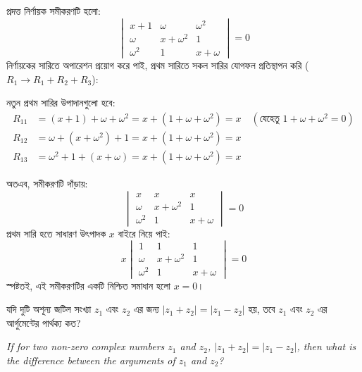 \documentclass[12pt, a4paper]{article}
\begin{document}
\begin{tcolorbox}[solutionbox={সমাধান (Solution)}]
    \noindent
    প্রদত্ত নির্ণায়ক সমীকরণটি হলো:
    \[ \begin{vmatrix} x+1 & \omega & \omega^2 \\ \omega & x+\omega^2 & 1 \\ \omega^2 & 1 & x+\omega \end{vmatrix} = 0 \]
    নির্ণায়কের সারিতে অপারেশন প্রয়োগ করে পাই, প্রথম সারিতে সকল সারির যোগফল প্রতিস্থাপন করি ($R_1 \rightarrow R_1 + R_2 + R_3$):
    
    \vspace{0.5em}
    নতুন প্রথম সারির উপাদানগুলো হবে:
    \begin{align*}
        R_{11} &= (x + 1) + \omega + \omega^2 = x + (1 + \omega + \omega^2) = x \quad (\text{যেহেতু } 1 + \omega + \omega^2 = 0) \\
        R_{12} &= \omega + (x + \omega^2) + 1 = x + (1 + \omega + \omega^2) = x \\
        R_{13} &= \omega^2 + 1 + (x + \omega) = x + (1 + \omega + \omega^2) = x
    \end{align*}
    
    \vspace{0.5em}
    অতএব, সমীকরণটি দাঁড়ায়:
    \[ \begin{vmatrix} x & x & x \\ \omega & x+\omega^2 & 1 \\ \omega^2 & 1 & x+\omega \end{vmatrix} = 0 \]
    প্রথম সারি হতে সাধারণ উৎপাদক $x$ বাইরে নিয়ে পাই:
    \[ x \begin{vmatrix} 1 & 1 & 1 \\ \omega & x+\omega^2 & 1 \\ \omega^2 & 1 & x+\omega \end{vmatrix} = 0 \]
    স্পষ্টতই, এই সমীকরণটির একটি নিশ্চিত সমাধান হলো $x = 0$।
\end{tcolorbox}
\begin{tcolorbox}[questionbox={প্রশ্ন (Question) 19}]
    \noindent
    যদি দুটি অশূন্য জটিল সংখ্যা $z_1$ এবং $z_2$ এর জন্য $|z_1 + z_2| = |z_1 - z_2|$ হয়, তবে $z_1$ এবং $z_2$ এর আর্গুমেন্টের পার্থক্য কত?
    
    \vspace{0.8em}
    \begin{english}
    \noindent\textit{\color{darkgray}
    If for two non-zero complex numbers $z_1$ and $z_2$, $|z_1 + z_2| = |z_1 - z_2|$, then what is the difference between the arguments of $z_1$ and $z_2$?
    }
    \end{english}
\end{tcolorbox}
\end{document}
